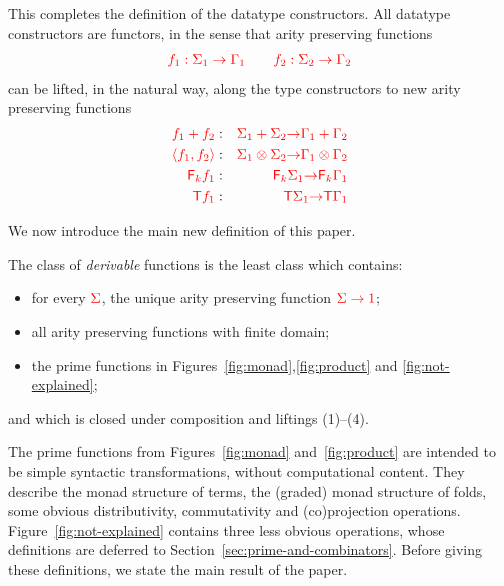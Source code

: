 \smallskip
\newcommand{\funcitem}[3]{\ranked{#1  } &:& \ranked{#2} \rto  \ranked{#3}}
This completes the definition of the datatype constructors. 
All datatype constructors are functors, in the sense  that  arity preserving functions
\begin{align*}
{\color{red}{f_1 : \Sigma_1 \to \Gamma_1 \qquad f_2 : \Sigma_2 \to \Gamma_2}}
\end{align*}       
can be lifted, in the natural way, along the type constructors to new arity preserving  functions
\begin{eqnarray}
\label{eq:liftplus}\funcitem{f_1 + f_2}{\Sigma_1 + \Sigma_2}{\Gamma_1 + \Gamma_2} \\
\funcitem{\tensorpair{f_1,f_2}}{\Sigma_1 \otimes \Sigma_2}{\Gamma_1 \otimes \Gamma_2}\\
\funcitem{\reduce k f_1}{\reduce k \Sigma_1}{\reduce k \Gamma_1}\\
\funcitem{\tmonad f_1}{\tmonad \Sigma_1}{\tmonad \Gamma_1}
\end{eqnarray}

We now introduce the main new definition of this paper.

\begin{definition}
    The class of \emph{derivable} functions is the least class which contains:
    \begin{itemize}
    \item for every ${\color{red}{\Sigma}}$, the unique arity preserving function ${\color{red}{\Sigma \to {\color{red}{1}}}}$;
    \item  all arity preserving functions with finite domain;
        \item  the prime functions in Figures~\ref{fig:monad},\ref{fig:product} and \ref{fig:not-explained};
         \end{itemize}
and which is closed under composition and  liftings (1)--(4).
\end{definition}

%

The prime functions from Figures~\ref{fig:monad} and~\ref{fig:product} are intended to be simple syntactic transformations, without computational content. They describe the monad structure of terms, the (graded) monad structure of folds, some obvious distributivity, commutativity and (co)projection operations. Figure~\ref{fig:not-explained} contains  three less obvious operations, whose definitions are  deferred to Section~\ref{sec:prime-and-combinators}. Before giving these definitions, we state the main result of the paper. 

